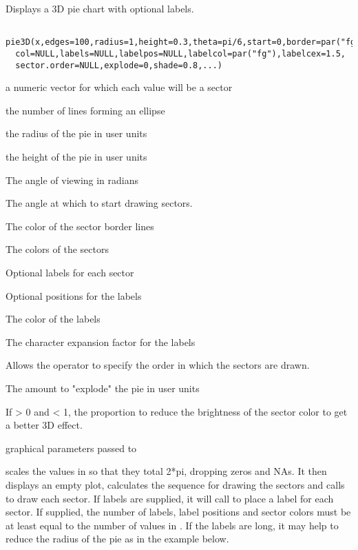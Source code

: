 \begin{Description}\relax
Displays a 3D pie chart with optional labels.
\end{Description}
\begin{Usage}
\begin{verbatim}
 pie3D(x,edges=100,radius=1,height=0.3,theta=pi/6,start=0,border=par("fg"),
  col=NULL,labels=NULL,labelpos=NULL,labelcol=par("fg"),labelcex=1.5,
  sector.order=NULL,explode=0,shade=0.8,...)
\end{verbatim}
\end{Usage}
\begin{Arguments}
\begin{ldescription}
\item[\code{x}] a numeric vector for which each value will be a sector
\item[\code{edges}] the number of lines forming an ellipse
\item[\code{radius}] the radius of the pie in user units
\item[\code{height}] the height of the pie in user units
\item[\code{theta}] The angle of viewing in radians
\item[\code{start}] The angle at which to start drawing sectors.
\item[\code{border}] The color of the sector border lines
\item[\code{col}] The colors of the sectors
\item[\code{labels}] Optional labels for each sector
\item[\code{labelpos}] Optional positions for the labels
\item[\code{labelcol}] The color of the labels
\item[\code{labelcex}] The character expansion factor for the labels
\item[\code{sector.order}] Allows the operator to specify the order in
which the sectors are drawn.
\item[\code{explode}] The amount to "explode" the pie in user units
\item[\code{shade}] If \textgreater{} 0 and \textless{} 1, the proportion to reduce the
brightness of the sector color to get a better 3D effect.
\item[\code{...}] graphical parameters passed to 
\end{ldescription}
\end{Arguments}
\begin{Details}\relax
{} scales the values in  so that they total 2*pi,
dropping zeros and NAs. It then displays an empty plot, calculates
the sequence for drawing the sectors and calls 
to draw each sector. If labels are supplied, it will call 
to place a label for each sector. If supplied, the number of labels, label 
positions and sector colors must be at least equal to the number of values 
in . If the labels are long, it may help to reduce the radius of
the pie as in the example below.
\end{Details}

